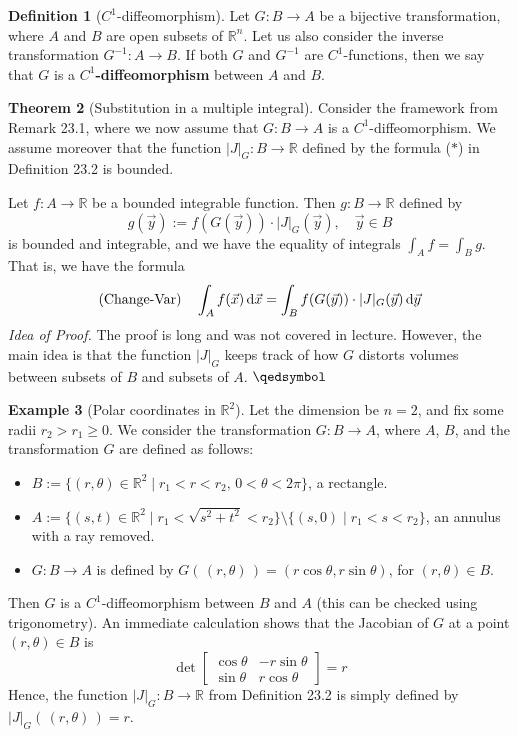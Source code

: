 \documentclass[11pt]{article}
\theoremstyle{definition}
\newtheorem{thm}{Theorem}[section]
\newtheorem{defn}[thm]{Definition}
\newtheorem{exmp}[thm]{Example}
\newcommand{\R}{\ensuremath{\mathbb{R}}}
\begin{document}
\begin{defn}[$C^1$-diffeomorphism]
Let $G : B \to A$ be a bijective transformation, where $A$ and $B$ are open subsets of $\R^n$. Let us also consider the inverse transformation $G^{-1} : A \to B$. If both $G$ and $G^{-1}$ are $C^1$-functions, then we say that $G$ is a {\bf $C^1$-diffeomorphism} between $A$ and $B$.
\end{defn}

\begin{thm}[Substitution in a multiple integral]
Consider the framework from Remark 23.1, where we now assume that $G : B \to A$ is a $C^1$-diffeomorphism. We assume moreover that the function $|J|_G : B \to \R$ defined by the formula ($*$) in Definition 23.2 is bounded. 

Let $f : A \to \R$ be a bounded integrable function. Then $g : B \to \R$ defined by
$$g(\vec{y}) := f(G(\vec{y})) \cdot |J|_G(\vec{y}), \quad \vec{y} \in B$$
is bounded and integrable, and we have the equality of integrals $\int_A f = \int_B g$. That is, we have the formula
$$\text{(Change-Var)} \quad \int_A f(\vec{x})\,{\rm d}\vec{x} = \int_B f(G(\vec{y})) \cdot |J|_G(\vec{y})\,{\rm d}\vec{y}$$
\emph{Idea of Proof.} The proof is long and was not covered in lecture. However, the main idea is that the function $|J|_G$ keeps track of how $G$ distorts volumes between subsets of $B$ and subsets of $A$. \hfill $\qedsymbol$
\end{thm}

\begin{exmp}[Polar coordinates in $\R^2$]
Let the dimension be $n = 2$, and fix some radii $r_2 > r_1 \geq 0$. We consider the transformation $G : B \to A$, where $A$, $B$, and the transformation $G$ are defined as follows:
\vspace{-1.5ex}\begin{itemize}
    \item $B := \{(r, \theta) \in \R^2 \mid r_1 < r < r_2,\, 0 < \theta < 2\pi\}$, a rectangle.
    \item $A := \{(s, t) \in \R^2 \mid r_1 < \sqrt{s^2+t^2} < r_2\} \setminus \{(s, 0) \mid r_1 < s < r_2\}$, an annulus with a ray removed.
    \item $G : B \to A$ is defined by $G(\,(r, \theta)\,) = (r\cos\theta, r\sin\theta)$, for $(r, \theta) \in B$.
\end{itemize}\vspace{-1.5ex}
Then $G$ is a $C^1$-diffeomorphism between $B$ and $A$ (this can be checked using trigonometry). An immediate calculation shows that the Jacobian of $G$ at a point $(r, \theta) \in B$ is
$$\det \begin{bmatrix} \cos\theta & -r\sin\theta \\ \sin\theta & r\cos\theta \end{bmatrix} = r$$
Hence, the function $|J|_G : B \to \R$ from Definition 23.2 is simply defined by $|J|_G(\,(r, \theta)\,) = r$.
\end{exmp}
\end{document}
